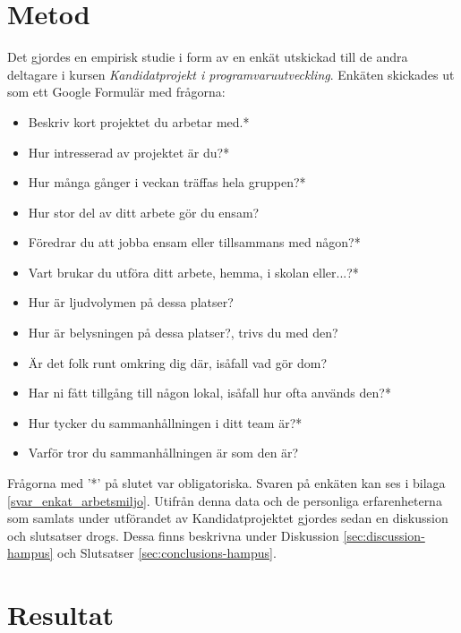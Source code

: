 \section{Metod}
\label{sec:method-hampus}

Det gjordes en empirisk studie i form av en enkät utskickad till de andra deltagare i kursen \textit{Kandidatprojekt i programvaruutveckling}. Enkäten skickades ut som ett Google Formulär med frågorna:
\begin{itemize}
\item Beskriv kort projektet du arbetar med.*
\item Hur intresserad av projektet är du?*
\item Hur många gånger i veckan träffas hela gruppen?*
\item Hur stor del av ditt arbete gör du ensam?
\item Föredrar du att jobba ensam eller tillsammans med någon?*
\item Vart brukar du utföra ditt arbete, hemma, i skolan eller...?*
\item Hur är ljudvolymen på dessa platser?
\item Hur är belysningen på dessa platser?, trivs du med den?
\item Är det folk runt omkring dig där, isåfall vad gör dom?
\item Har ni fått tillgång till någon lokal, isåfall hur ofta används den?*
\item Hur tycker du sammanhållningen i ditt team är?*
\item Varför tror du sammanhållningen är som den är?
\end{itemize}
Frågorna med '*' på slutet var obligatoriska. Svaren på enkäten kan ses i bilaga \ref{svar_enkat_arbetsmiljo}. Utifrån denna data och de personliga erfarenheterna som samlats under utförandet av Kandidatprojektet gjordes sedan en diskussion och slutsatser drogs. Dessa finns beskrivna under Diskussion \ref{sec:discussion-hampus} och Slutsatser \ref{sec:conclusions-hampus}. 

\section{Resultat}
\label{sec:results-hampus}

